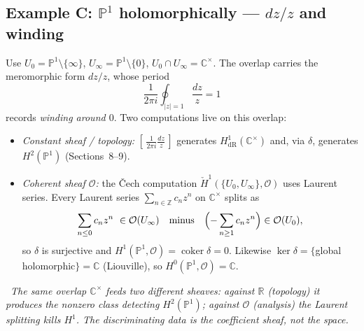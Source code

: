 \documentclass[11pt]{article}
\newcommand{\CC}{\mathbb C}
\newcommand{\RR}{\mathbb R}
\newcommand{\ZZ}{\mathbb Z}
\newcommand{\PP}{\mathbb P}
\newcommand{\OO}{\mathcal O}
\newcommand{\Hcech}{\check H}
\newcommand{\dR}{\mathrm{dR}}
\newcommand{\coker}{\operatorname{coker}}
\newcommand{\kerop}{\operatorname{ker}}
\newcommand{\diagnose}[1]{%
  \par\smallskip\noindent{\color{accent}\textbf{Diagnosis.}}\ \emph{#1}\par\smallskip}
\theoremstyle{plain}
\theoremstyle{definition}
\begin{document}
\subsection*{Example C: \(\PP^1\) holomorphically --- \(dz/z\) and winding}
Use $U_0=\PP^1\setminus\{\infty\}$, $U_\infty=\PP^1\setminus\{0\}$,
$U_0\cap U_\infty=\CC^\times$. The overlap carries the meromorphic form $dz/z$,
whose period
\[
  \frac{1}{2\pi i}\oint_{|z|=1}\frac{dz}{z}=1
\]
records \emph{winding around $0$}. Two computations live on this overlap:
\begin{itemize}
  \item \emph{Constant sheaf / topology:} $[\,\tfrac{1}{2\pi i}\tfrac{dz}{z}\,]$
        generates $H^1_\dR(\CC^\times)$ and, via $\delta$, generates $H^2(\PP^1)$
        (Sections~8--9).
  \item \emph{Coherent sheaf $\OO$:} the \v Cech computation
        $\Hcech^1(\{U_0,U_\infty\},\OO)$ uses Laurent series. Every Laurent series
        $\sum_{n\in\ZZ}c_nz^n$ on $\CC^\times$ splits as
        \[
          \sum_{n\le0}c_nz^n\ \in\OO(U_\infty)\quad\text{minus}\quad
          \Bigl(-\sum_{n\ge1}c_nz^n\Bigr)\in\OO(U_0),
        \]
        so $\delta$ is surjective and $H^1(\PP^1,\OO)=\coker\delta=0$. Likewise
        $\kerop\delta=\{$global holomorphic$\}=\CC$ (Liouville), so
        $H^0(\PP^1,\OO)=\CC$.
\end{itemize}
\diagnose{The \emph{same} overlap $\CC^\times$ feeds two different sheaves: against
$\RR$ (topology) it produces the nonzero class detecting $H^2(\PP^1)$; against
$\OO$ (analysis) the Laurent splitting kills $H^1$. The discriminating data is
the coefficient sheaf, not the space.}
\end{document}
